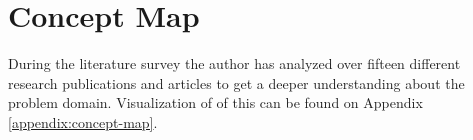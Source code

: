 \section{Concept Map}

During the literature survey the author has analyzed over fifteen different research publications and articles to get a deeper understanding about the problem domain. Visualization of of this can be found on Appendix \ref{appendix:concept-map}.

